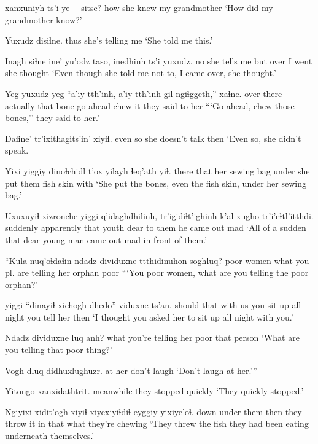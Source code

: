 \documentclass[12pt]{article}
\begin{document}
 xanxuniyh ts'i ye--- sitse?
how          {she knew} {} {}    {my grandmother}
\glt `How did my grandmother know?'
\glend

\gll Yuxudz disiɬne.
thus   {she's telling me}
\glt `She told me this.'
\glend

\gll Inagh siɬne        ine' yu'odz taso,   inedhinh    ts'i yuxudz.
no    {she tells me} but  over   {I went} {she thought} 
\glt `Even though she told me not to, I came over, she thought.'
\glend

\gll Yeg {yuxudz yeg} ``a'iy tth'inh, {a'iy tth'inh} gil      ngiɬggeth,'' xaɬne.
{over there} actually that bone {}                 {go ahead} {chew it}   {they said to her}
\glt ```Go ahead, chew those bones,'' they said to her.'
\glend

\gll Daɬine' {tr'ixithagits'in'} xiyiɬ. 
{even so} {she doesn't talk} then
\glt `Even so, she didn't speak. 
\glend

\gll Yixi yiggiy dinoɬchidl   t'ox  yilayh       ɬeq'ath   yiɬ.
there that {her sewing bag} under {she put them} {fish skin} with
\glt `She put the bones, even the fish skin, under her sewing bag.'
\glend

\gll Uxuxuyiɬ xizronche yiggi q'idaghdhilinh, tr'igidiɬt'ighinh k'al     xugho   tr'i'eɬtl'itthdi.
suddenly  apparently       that  youth           {}                dear {to them} {he came out mad}
\glt `All of a sudden that dear young man came out mad in front of them.'
\glend

\gll ``Kula nuq'oɬdaɬin ndadz dividuxne         ttthidinuhon soghluq? 
poor women       what  {you pl. are telling her} orphan      poor
\glt ```You poor women, what are you telling the poor orphan?'
\glend

 yiggi ``dinayiɬ {xichogh dhedo''}        viduxne      ts'an.
{should}     that  {with us} {you sit up all night} {you tell her} then
\glt `I thought you asked her to sit up all night with you.'
\glend

\gll Ndadz dividuxne          luq  anh?
what  {you're telling her} poor {that person} 
\glt `What are you telling that poor thing?'
\glend

\gll Vogh   {dluq didhuxlughuzr}.
{at her} {don't laugh}    
\glt `Don't laugh at her.'''
\glend

\gll Yitongo   xanxidathtrit.
meanwhile {they stopped quickly}
\glt `They quickly stopped.'
\glend

\gll Ngiyixi xidit'ogh  xiyiɬ xiyexiyiɬdiɬ     eyggiy yixiye'oɬ.
down    {under them} then  {they throw it in} that   {what they're chewing}
\glt `They threw the fish they had been eating underneath themselves.'
\glend
\end{document}
